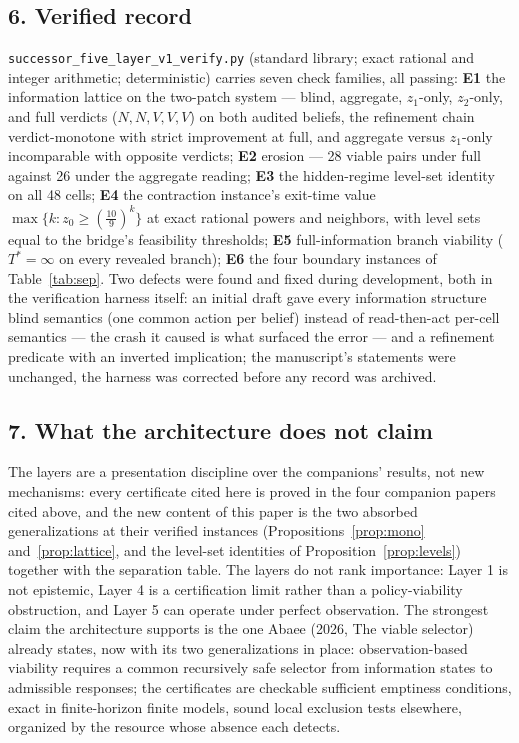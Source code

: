 \documentclass[10pt,twocolumn]{article}
\theoremstyle{definition}
\begin{document}
\subsection{6. Verified record}\label{verified}

\texttt{successor\_five\_layer\_v1\_verify.py} (standard library; exact
rational and integer arithmetic; deterministic) carries seven check
families, all passing: \textbf{E1} the information lattice on the two-patch
system --- blind, aggregate, \(z_{1}\)-only, \(z_{2}\)-only, and full
verdicts (\(N, N, V, V, V\)) on both audited beliefs, the refinement chain
verdict-monotone with strict improvement at full, and aggregate versus
\(z_{1}\)-only incomparable with opposite verdicts; \textbf{E2} erosion ---
28 viable pairs under full against 26 under the aggregate reading;
\textbf{E3} the hidden-regime level-set identity on all 48 cells;
\textbf{E4} the contraction instance's exit-time value
\(\max\{k : z_{0} \ge (\tfrac{10}{9})^{k}\}\) at exact rational powers and
neighbors, with level sets equal to the bridge's feasibility thresholds;
\textbf{E5} full-information branch viability (\(T^{*} = \infty\) on every
revealed branch); \textbf{E6} the four boundary instances of
Table~\ref{tab:sep}. Two defects were found and fixed during development,
both in the verification harness itself: an initial draft gave every
information structure blind semantics (one common action per belief)
instead of read-then-act per-cell semantics --- the crash it caused is what
surfaced the error --- and a refinement predicate with an inverted
implication; the manuscript's statements were unchanged, the harness was
corrected before any record was archived.

\subsection{7. What the architecture does not claim}\label{discipline}

The layers are a presentation discipline over the companions' results, not
new mechanisms: every certificate cited here is proved in the four
companion papers cited above, and the new content of this paper is the two absorbed
generalizations at their verified instances (Propositions~\ref{prop:mono}
and~\ref{prop:lattice}, and the level-set identities of
Proposition~\ref{prop:levels}) together with the separation table. The
layers do not rank importance: Layer 1 is not epistemic, Layer 4 is a
certification limit rather than a policy-viability obstruction, and Layer
5 can operate under perfect observation. The strongest claim the
architecture supports is the one Abaee (2026, The viable selector) already states, now with its
two generalizations in place: observation-based viability requires a common
recursively safe selector from information states to admissible responses;
the certificates are checkable sufficient emptiness conditions, exact in
finite-horizon finite models, sound local exclusion tests elsewhere,
organized by the resource whose absence each detects.
\end{document}

